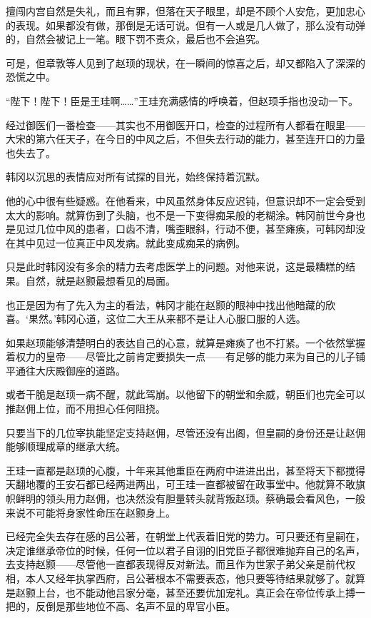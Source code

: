 擅闯内宫自然是失礼，而且有罪，但落在天子眼里，却是不顾个人安危，更加忠心的表现。如果都没有做，那倒是无话可说。但有一人或是几人做了，那么没有动弹的，自然会被记上一笔。眼下罚不责众，最后也不会追究。

可是，但章敦等人见到了赵顼的现状，在一瞬间的惊喜之后，却又都陷入了深深的恐慌之中。

“陛下！陛下！臣是王珪啊……”王珪充满感情的呼唤着，但赵顼手指也没动一下。

经过御医们一番检查——其实也不用御医开口，检查的过程所有人都看在眼里——大宋的第六任天子，在今日的中风之后，不但失去行动的能力，甚至连开口的力量也失去了。

韩冈以沉思的表情应对所有试探的目光，始终保持着沉默。

他的心中很有些疑惑。在他看来，中风虽然身体反应迟钝，但意识却不一定会受到太大的影响。就算伤到了头脑，也不是一下变得痴呆般的老糊涂。韩冈前世今身也是见过几位中风的患者，口齿不清，嘴歪眼斜，行动不便，甚至瘫痪，可韩冈却没在其中见过一位真正中风发病。就此变成痴呆的病例。

只是此时韩冈没有多余的精力去考虑医学上的问题。对他来说，这是最糟糕的结果。自然，就是赵颢最想看见的局面。

也正是因为有了先入为主的看法，韩冈才能在赵颢的眼神中找出他暗藏的欣喜。‘果然。’韩冈心道，这位二大王从来都不是让人心服口服的人选。

如果赵顼能够清楚明白的表达自己的心意，就算是瘫痪了也不打紧。一个依然掌握着权力的皇帝——尽管比之前肯定要损失一点——有足够的能力来为自己的儿子铺平通往大庆殿御座的道路。

或者干脆是赵顼一病不醒，就此驾崩。以他留下的朝堂和余威，朝臣们也完全可以推赵佣上位，而不用担心任何阻挠。

只要当下的几位宰执能坚定支持赵佣，尽管还没有出阁，但皇嗣的身份还是让赵佣能够顺理成章的继承大统。

王珪一直都是赵顼的心腹，十年来其他重臣在两府中进进出出，甚至将天下都搅得天翻地覆的王安石都已经两进两出，可王珪一直都被留在政事堂中。他就算不敢旗帜鲜明的领头用力赵佣，也决然没有胆量转头就背叛赵顼。蔡确最会看风色，一般来说不可能将身家性命压在赵颢身上。

已经完全失去存在感的吕公著，在朝堂上代表着旧党的势力。可只要还有皇嗣在，决定谁继承帝位的时候，任何一位以君子自诩的旧党臣子都很难抛弃自己的名声，去支持赵颢——尽管他一直都表现得反对新法。而且作为世家子弟父亲是前代权相，本人又经年执掌西府，吕公著根本不需要表态，他只要等待结果就够了。就算是赵颢上台，也不能动他吕家分毫，甚至还要优加宠礼。真正会在帝位传承上搏一把的，反倒是那些地位不高、名声不显的卑官小臣。

